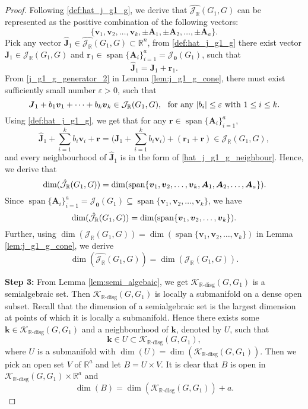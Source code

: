 \documentclass[11pt]{article}
\theoremstyle{plain}
\theoremstyle{definition}
\theoremstyle{remark}
\newcommand\RR{\mathbb{R}}
\newcommand\bk{\boldsymbol{k}}
\newcommand\bv{\boldsymbol{v}}
\newcommand\bA{\boldsymbol{A}}
\newcommand\br{\boldsymbol{r}}
\newcommand\bJ{\boldsymbol{J}}
\newcommand{\dK}{\mathcal{K}_{\RR\text{-disg}}}
\newcommand{\mJ}{\mathcal{J}_{\RR}}
\newcommand{\eJ}{\mathcal{J}_{\textbf{0}}}
\DeclareMathOperator{\spn}{span}
\begin{document}
\begin{proof}
Following \eqref{def:hat_j_g1_g}, we derive that $\hat{\mJ} (G_1, G)$ can be represented as the positive combination of the following vectors: 
\begin{equation} \label{hj_g1g_basis}
\{ \bv_1, \bv_2, \ldots, \bv_k, \pm \bA_1, \pm \bA_2, \ldots, \pm \bA_a \}. 
\end{equation}
Pick any vector $\hat{\bJ}_1 \in \hat{\mJ} (G_1, G) \subset \RR^n$, 
from \eqref{def:hat_j_g1_g} there exist vector $\bJ_1 \in \mJ (G_1, G)$ and $\br_1 \in \spn \{ \bA_i \}^a_{i=1} = \eJ(G_1)$, such that
\[
\hat{\bJ}_1 = \bJ_1 + \br_1.
\]
From \eqref{j_g1_g_generator_2} in Lemma \ref{lem:j_g1_g_cone}, there must exist sufficiently small number $\varepsilon > 0$, such that
\begin{equation} \notag
\bJ_1 + b_1 \bv_1 + \cdots + b_k \bv_k \in \mJ (G_1, G), 
\ \text{ for any }
|b_i| \leq \varepsilon
 \text{ with } 
1 \leq i \leq k.
\end{equation}
Using \eqref{def:hat_j_g1_g}, we get that for any $\br \in \spn \{ \bA_i \}^a_{i=1}$,
\begin{equation} 
\label{hat_j_g1_g_neighbour}
\hat{\bJ}_1 + \sum\limits^k_{i=1} b_i \bv_i + \br 
= \big( \bJ_1 + \sum\limits^k_{i=1} b_i \bv_i \big) + ( \br_1 + \br)
\in \mJ (G_1, G),
\end{equation}
and every neighbourhood of $\hat{\bJ}_1$ is in the form of \eqref{hat_j_g1_g_neighbour}.
Hence, we derive that
\begin{equation} \notag
\dim (\hat{\mJ} (G_1, G)) =\dim ( \spn \{ \bv_1, \bv_2, \ldots, \bv_k, \bA_1, \bA_2, \ldots, \bA_a \} ).
\end{equation}
Since $\spn \{ \bA_i \}^a_{i=1} = \eJ(G_1) \subseteq \spn \{ \bv_1, \bv_2, \ldots, \bv_k \}$, we have
\begin{equation} \notag
\dim (\hat{\mJ} (G_1, G)) = \dim ( \spn \{ \bv_1, \bv_2, \ldots, \bv_k \} ).
\end{equation}
Further, using $\dim (\mJ (G_1, G)) = \dim ( \spn \{ \bv_1, \bv_2, \ldots, \bv_k \} )$ in Lemma \ref{lem:j_g1_g_cone}, we derive 
\begin{equation} \label{hat_j_g1_g_generator_dim}
\dim (\hat{\mJ} (G_1, G)) = \dim (\mJ (G_1, G)).
\end{equation}

\medskip

\textbf{Step 3: }
From Lemma \ref{lem:semi_algebaic}, we get $\dK(G,G_1)$ is a semialgebraic set. Then $\dK(G, G_1)$ is locally a submanifold on a dense open subset. 
Recall that the dimension of a semialgebraic set is the largest dimension at points of which it is locally a submanifold.
Hence there exists some $\bk \in \dK(G, G_1)$ and a neighbourhood of $\bk$, denoted by $U$, such that 
\[
\bk \in U \subset \dK(G, G_1),
\]
where $U$ is a submanifold with $\dim (U) = \dim (\dK(G, G_1))$. 
Then we pick an open set $V$ of $\RR^a$ and let $B = U \times V$.
It is clear that $B$ is open in $\dK(G,G_1)\times \RR^a$ and
\begin{equation}
\label{eq:B_dim}
\dim (B) = \dim (\dK(G, G_1)) + a.
\end{equation}


\end{proof}
\end{document}
